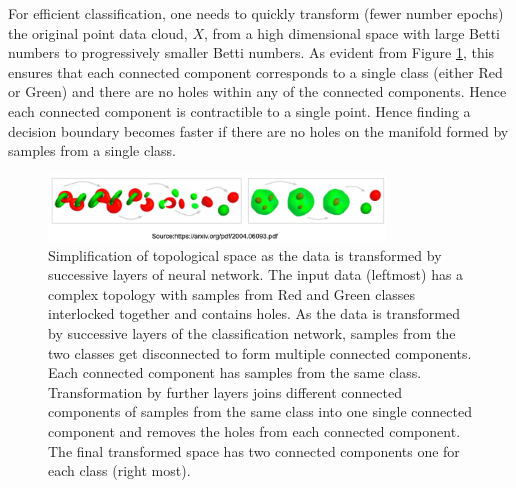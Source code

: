 \documentclass[wcp]{jmlr}
\begin{document}
For efficient classification, one needs to quickly transform (fewer number epochs) the original point data cloud, $X$,  from a high dimensional space with large Betti numbers to progressively smaller Betti numbers. As evident from Figure \ref{fig:topological_simplication_layer_by_layer}, this ensures that each connected component  corresponds to a single class (either Red or Green) and there are no holes within any of the connected components. Hence  each connected component is contractible to a single point. Hence finding a decision boundary becomes faster if there are no holes on the manifold formed by samples from a single class.

\begin{figure}[htp]
\begin{center}
\includegraphics[width=0.8\textwidth]{images/topological_simplication_layer_by_layer.png}
\caption{Simplification of topological space as the data is transformed by successive layers of neural network. The input data (leftmost) has a complex topology with samples from Red and Green classes interlocked together and contains holes. As the data is transformed by successive layers of the classification network, samples from the two classes get disconnected to form multiple connected components. Each connected component has samples from the same class. Transformation by further layers joins different connected components of samples from the same class into one single connected component and  removes the holes from each connected component. The final transformed space has two connected components one for each class (right most).
}\label{fig:topological_simplication_layer_by_layer}
\end{center}
\end{figure}
\end{document}
